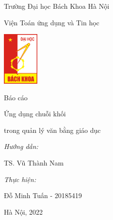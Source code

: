 \begin{titlepage}
    \centering
    \vspace{0.25cm}
    {\large Trường Đại học Bách Khoa Hà Nội\par}
    \vspace{0.25cm}
    {\normalsize Viện Toán ứng dụng và Tin học\par}
    \vspace{0.75cm}
    {\includegraphics[width=69px]{images/hust-logo.png}\par}
    \vspace{0.75cm}
    {\huge Báo cáo\par}
    \vspace{0.5cm}
    {\Large Ứng dụng chuỗi khối\par}
    \vspace{0.25cm}
    {\Large trong quản lý văn bằng giáo dục\par}
    \vspace{1cm}
    \begin{flushleft}
        \hspace{3cm}
        {\normalsize\textit{Hướng dẫn:}\par}
        \vspace{0.125cm}
        \hspace{5cm}
        {\normalsize TS. Vũ Thành Nam\par}
        \vspace{0.125cm}
        \hspace{3cm}
        {\normalsize\textit{Thực hiện:}\par}
        \vspace{0.125cm}
        \hspace{5cm}
        {\normalsize Đỗ Minh Tuấn - 20185419\par}
    \end{flushleft}
    \vspace{3cm}
    {\normalsize Hà Nội, 2022\par}
    \vspace{0.5cm}
\end{titlepage}